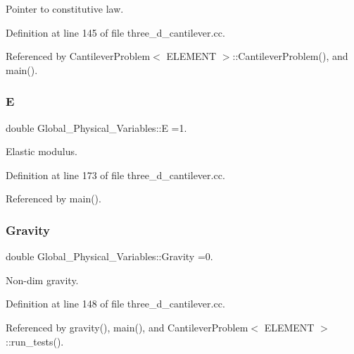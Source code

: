 Pointer to constitutive law. 



Definition at line 145 of file three\+\_\+d\+\_\+cantilever.\+cc.



Referenced by Cantilever\+Problem$<$ E\+L\+E\+M\+E\+N\+T $>$\+::\+Cantilever\+Problem(), and main().

\mbox{\label{namespaceGlobal__Physical__Variables_a09a019474b7405b35da2437f7779bc7e}} 
\subsubsection{\texorpdfstring{E}{E}}
{\footnotesize\ttfamily double Global\+\_\+\+Physical\+\_\+\+Variables\+::E =1.}



Elastic modulus. 



Definition at line 173 of file three\+\_\+d\+\_\+cantilever.\+cc.



Referenced by main().

\mbox{\label{namespaceGlobal__Physical__Variables_a8b80d3e8d63b8d0a0ed435a2dd7fe2ad}} 
\subsubsection{\texorpdfstring{Gravity}{Gravity}}
{\footnotesize\ttfamily double Global\+\_\+\+Physical\+\_\+\+Variables\+::\+Gravity =0.}



Non-\/dim gravity. 



Definition at line 148 of file three\+\_\+d\+\_\+cantilever.\+cc.



Referenced by gravity(), main(), and Cantilever\+Problem$<$ E\+L\+E\+M\+E\+N\+T $>$\+::run\+\_\+tests().

